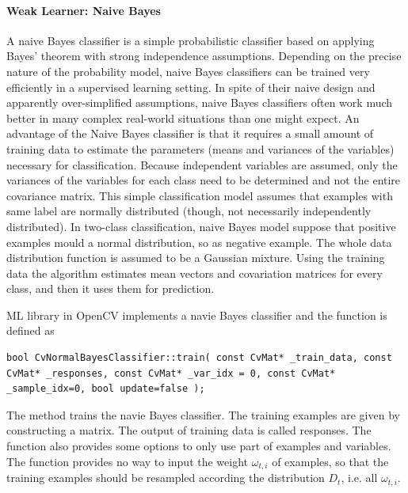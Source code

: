 \paragraph{Weak Learner: Naive Bayes}
A naive Bayes classifier is a simple probabilistic classifier based on applying Bayes' theorem with strong independence assumptions. Depending on the precise nature of the probability model, naive Bayes classifiers can be trained very efficiently in a supervised learning setting. In spite of their naive design and apparently over-simplified assumptions, naive Bayes classifiers often work much better in many complex real-world situations than one might expect. An advantage of the Naive Bayes classifier is that it requires a small amount of training data to estimate the parameters (means and variances of the variables) necessary for classification. Because independent variables are assumed, only the variances of the variables for each class need to be determined and not the entire covariance matrix. This simple classification model assumes that examples with same label are normally distributed (though, not necessarily independently distributed). In two-class classification, naive Bayes model suppose that positive examples mould a normal distribution, so as negative example. The whole data distribution function is assumed to be a Gaussian mixture. Using the training data the algorithm estimates mean vectors and covariation matrices for every class, and then it uses them for prediction.

ML library in OpenCV implements a navie Bayes classifier and the function is defined as
\lstset{language=C++}
\lstset{basicstyle=\scriptsize\ttfamily,
showspaces=false,
showtabs=false,
columns=fixed,
frame=none,
numberstyle=\scriptsize,
breaklines=true,
showstringspaces=false,
xleftmargin=1cm
}
\begin{lstlisting}
bool CvNormalBayesClassifier::train( const CvMat* _train_data, const CvMat* _responses, const CvMat* _var_idx = 0, const CvMat* _sample_idx=0, bool update=false );
\end{lstlisting}
The method trains the navie Bayes classifier. The training examples are given by constructing a matrix. The output of training data is called responses. The function also provides some options to only use part of examples and variables. The function provides no way to input the weight $\omega_{t,i}$ of examples, so that the training examples should be resampled according the distribution $D_{t}$, i.e. all $\omega_{t,i}$.


